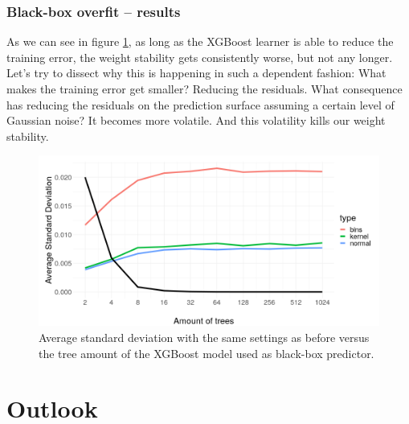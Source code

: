 \documentclass[
]{krantz}
\begin{document}
\hypertarget{black-box-overfit-results}{%
\subsubsection{Black-box overfit -- results}\label{black-box-overfit-results}}

As we can see in figure \ref{fig:figoverfit}, as long as the XGBoost learner is able to reduce the training error, the weight stability gets consistently worse, but not any longer.
Let's try to dissect why this is happening in such a dependent fashion:
What makes the training error get smaller?
Reducing the residuals.
What consequence has reducing the residuals on the prediction surface assuming a certain level of Gaussian noise?
It becomes more volatile.
And this volatility kills our weight stability.

\begin{figure}

{\centering \includegraphics[width=13.89in]{images/sd_overfitting_presi2} 

}

\caption{Average standard deviation with the same settings as before versus the tree amount of the XGBoost model used as black-box predictor.}\label{fig:figoverfit}
\end{figure}

\hypertarget{outlook-2}{%
\section{Outlook}\label{outlook-2}}
\end{document}
